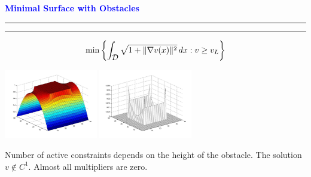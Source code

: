 \documentclass{seminar}
\newcommand{\grad}{\nabla}
\newcommand{\redstripe}{\textcolor{red}{\hrule height 2.0pt\hfil}
             \vspace{-1.8pt}
             \textcolor{red}{\hrule height 1.0pt\hfil}
}
\newcommand{\heading}[1]{%
   \centerline{\textcolor{blue}{\textbf{#1}}}%
    \redstripe%
    \bigskip
}
\newcommand{\cD} {\mbox{$\cal D$}}
\begin{document}
\begin{slide}

\heading{Minimal Surface with Obstacles}

\[
\min 
\left \{
\int_{ \cD } \sqrt { 1 + \| \grad v (x) \| ^ 2 } \, d x : v \ge v_L
\right \}
\]

\medskip

\begin{center}
\ifpdf
\includegraphics[height=1.2in]{../images/mso_s}
\qquad
\includegraphics[height=1.2in]{../images/mso_e}
\else
\fi
\end{center}

\bigskip

Number of active constraints depends on the height of the
obstacle. The solution $ v \notin C^1 $.
Almost all multipliers are zero. 

\vfill

\end{slide}
\end{document}
